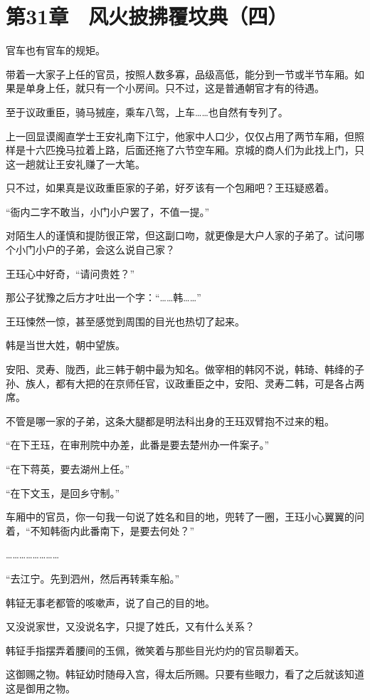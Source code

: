 \section{第31章　风火披拂覆坟典（四）}

官车也有官车的规矩。

带着一大家子上任的官员，按照人数多寡，品级高低，能分到一节或半节车厢。如果是单身上任，就只有一个小房间。只不过，这是普通朝官才有的待遇。

至于议政重臣，骑马狨座，乘车八驾，上车……也自然有专列了。

上一回显谟阁直学士王安礼南下江宁，他家中人口少，仅仅占用了两节车厢，但照样是十六匹挽马拉着上路，后面还拖了六节空车厢。京城的商人们为此找上门，只这一趟就让王安礼赚了一大笔。

只不过，如果真是议政重臣家的子弟，好歹该有一个包厢吧？王珏疑惑着。

“衙内二字不敢当，小门小户罢了，不值一提。”

对陌生人的谨慎和提防很正常，但这副口吻，就更像是大户人家的子弟了。试问哪个小门小户的子弟，会这么说自己家？

王珏心中好奇，“请问贵姓？”

那公子犹豫之后方才吐出一个字：“……韩……”

王珏悚然一惊，甚至感觉到周围的目光也热切了起来。

韩是当世大姓，朝中望族。

安阳、灵寿、陇西，此三韩于朝中最为知名。做宰相的韩冈不说，韩琦、韩绛的子孙、族人，都有大把的在京师任官，议政重臣之中，安阳、灵寿二韩，可是各占两席。

不管是哪一家的子弟，这条大腿都是明法科出身的王珏双臂抱不过来的粗。

“在下王珏，在审刑院中办差，此番是要去楚州办一件案子。”

“在下蒋英，要去湖州上任。”

“在下文玉，是回乡守制。”

车厢中的官员，你一句我一句说了姓名和目的地，兜转了一圈，王珏小心翼翼的问着，“不知韩衙内此番南下，是要去何处？”

……………………

“去江宁。先到泗州，然后再转乘车船。”

韩钲无事老都管的咳嗽声，说了自己的目的地。

又没说家世，又没说名字，只提了姓氏，又有什么关系？

韩钲手指摆弄着腰间的玉佩，微笑着与那些目光灼灼的官员聊着天。

这御赐之物。韩钲幼时随母入宫，得太后所赐。只要有些眼力，看了之后就该知道这是御用之物。

